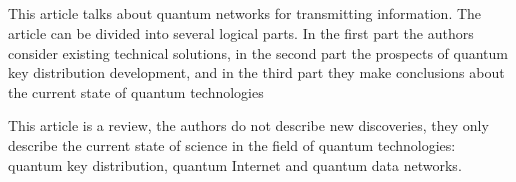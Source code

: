 \subsection{\review}
This article talks about quantum networks for transmitting information. The article can be divided into several logical parts.  In the first part the authors consider existing technical solutions, in the second part the prospects of quantum key distribution development, and in the third part they make conclusions about the current state of quantum technologies

This article is a review, the authors do not describe new discoveries, they only describe the current state of science in the field of quantum technologies: quantum key distribution, quantum Internet and quantum data networks.


\subsection{\dic}
